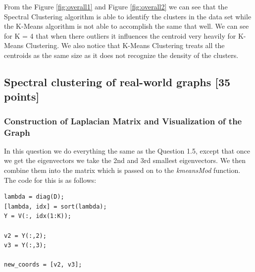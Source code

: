 \documentclass[unicode,11pt,a4paper,oneside,numbers=endperiod,openany]{scrartcl}
\begin{document}
From the Figure \ref{fig:overall1} and Figure \ref{fig:overall2} we can see that the Spectral Clustering algorithm is able to identify the clusters in the data set while the K-Means algorithm is not able to accomplish the same that well. We can see for K = 4 that when there outliers it influences the centroid very heavily for K-Means Clustering. We also notice that K-Means Clustering treats all the centroids as the same size as it does not recognize the density of the clusters.


\subsection{Spectral clustering of real-world graphs [35 points]}

\subsubsection{Construction of Laplacian Matrix and Visualization of the Graph}
In this question we do everything the same as the Question 1.5, except that once we get the eigenvectors we take the 2nd and 3rd smallest eigenvectors. We then combine them into the matrix which is passed on to the \textit{kmeansMod} function. The code for this is as follows:

\begin{lstlisting}
lambda = diag(D);
[lambda, idx] = sort(lambda);
Y = V(:, idx(1:K));

v2 = Y(:,2);
v3 = Y(:,3);

new_coords = [v2, v3];
\end{lstlisting}
\end{document}
